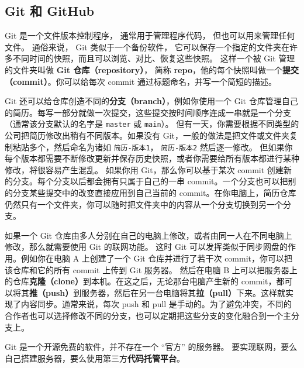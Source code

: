 \begin{issues}
\issueTODO
\end{issues}

\subsection{Git 和 GitHub}
Git 是一个文件版本控制程序， 通常用于管理程序代码， 但也可以用来管理任何文件。 通俗来说， Git 类似于一个备份软件， 它可以保存一个指定的文件夹在许多不同时间的快照，而且可以浏览、对比、恢复这些快照。 这样一个被 Git 管理的文件夹叫做 \textbf{Git 仓库（repository）}， 简称 \textbf{repo}，他的每个快照叫做一个\textbf{提交（commit）}。你可以给每次 commit 通过标题命名，并写一个简短的描述。


Git 还可以给仓库创造不同的\textbf{分支（branch）}，例如你使用一个 Git 仓库管理自己的简历。每写一部分就做一次提交，这些提交按时间顺序连成一串就是一个分支（通常该分支默认的名字是 \verb`master` 或 \verb`main`）。 但有一天，你需要根据不同类型的公司把简历修改出稍有不同版本。如果没有 Git，一般的做法是把文件或文件夹复制粘贴多个，然后命名为诸如 \verb`简历-版本1`， \verb`简历-版本2` 然后逐一修改。 但如果你每个版本都需要不断修改更新并保存历史快照，或者你需要给所有版本都进行某种修改，将很容易产生混乱。 如果你用 Git，那么你可以基于某次 commit 创建新的分支。每个分支以后都会拥有只属于自己的一串 commit。一个分支也可以把别的分支某些提交中的改变直接应用到自己当前的 commit。在你电脑上，简历仓库仍然只有一个文件夹，你可以随时把文件夹中的内容从一个分支切换到另一个分支。

如果一个 Git 仓库由多人分别在自己的电脑上修改，或者由同一人在不同电脑上修改，那么就需要使用 Git 的联网功能。 这时 Git 可以发挥类似于同步网盘的作用。例如你在电脑 A 上创建了一个 Git 仓库并进行了若干次 commit，你可以把该仓库和它的所有 commit 上传到 Git 服务器。 然后在电脑 B 上可以把服务器上的仓库\textbf{克隆（clone）}到本机。在这之后，无论那台电脑产生新的 commit，都可以将其\textbf{推（push）}到服务器，然后在另一台电脑将其\textbf{拉（pull）}下来。这样就实现了内容同步。通常来说，每次 push 和 pull 是手动的。为了避免冲突，不同的合作者也可以选择修改不同的分支，也可以定期把这些分支的变化融合到一个主分支上。

Git 是一个开源免费的软件，并不存在一个 “官方” 的服务器。 要实现联网，要么自己搭建服务器，要么使用第三方\textbf{代码托管平台}。

